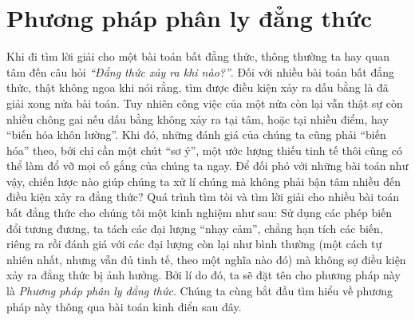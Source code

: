 \section{Phương pháp phân ly đẳng thức}
\begin{center}\textbf{\color{violet}{Dương Đức Lâm-Trường THPT Chuyên ĐHSP Hà Nội}}\end{center}
\noindent Khi đi tìm lời giải cho một bài toán bất đẳng thức, thông thường ta hay quan tâm đến câu hỏi \textit{``Đẳng thức xảy ra khi nào?''}. Đối với nhiều bài toán bất đẳng thức, thật không ngoa khi nói rằng, tìm được điều kiện xảy ra dấu bằng là đã giải xong nửa bài toán. Tuy nhiên công việc của một nửa còn lại vẫn thật sự còn nhiều chông gai nếu dấu bằng không xảy ra tại tâm, hoặc tại nhiều điểm, hay ``biến hóa khôn lường''. Khi đó, những đánh giá của chúng ta cũng phải ``biến hóa'' theo, bởi chỉ cần một chút ``sơ ý'', một ước lượng thiếu tinh tế thôi cũng có thể làm đổ vỡ mọi cố gắng của chúng ta ngay. Để đối phó với những bài toán như vậy, chiến lược nào giúp chúng ta xử lí chúng mà không phải bận tâm nhiều đến điều kiện xảy ra đẳng thức? Quá trình tìm tòi và tìm lời giải cho nhiều bài toán bất đẳng thức cho chúng tôi một kinh nghiệm như sau: Sử dụng các phép biến đổi tương đương, ta tách các đại lượng ``nhạy cảm'', chẳng hạn tích các biến, riêng ra rồi đánh giá với các đại lượng còn lại như bình thường (một cách tự nhiên nhất, nhưng vẫn đủ tinh tế, theo một nghĩa nào đó) mà không sợ điều kiện xảy ra đẳng thức bị ảnh hưởng. Bởi lí do đó, ta sẽ đặt tên cho phương pháp này là \textit{Phương pháp phân ly đẳng thức}. Chúng ta cùng bắt đầu tìm hiểu về phương pháp này thông qua bài toán kinh điển sau đây.


